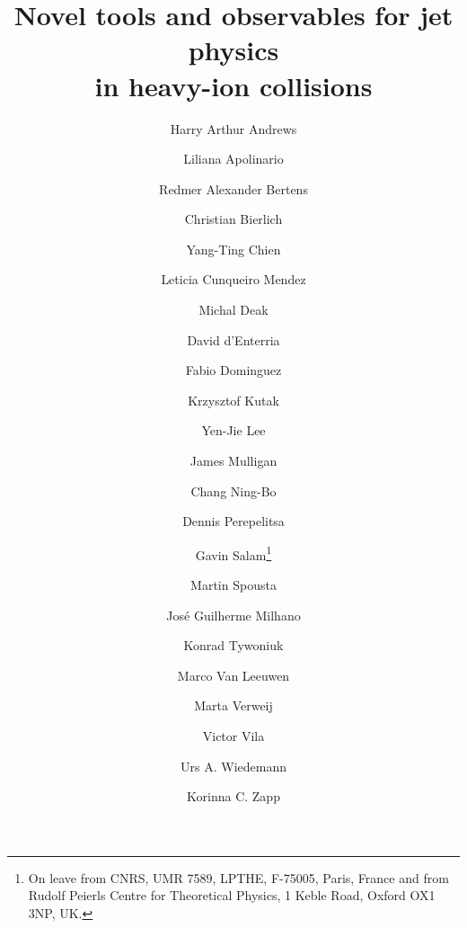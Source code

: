 \documentclass{article}
\begin{document}
\title{Novel tools and observables for jet physics \\ in heavy-ion collisions}
%
\author[bir]{Harry Arthur Andrews}
\author[lip,ist]{Liliana Apolinario}
\author[ten]{Redmer Alexander Bertens}
\author[lund,bohr]{Christian Bierlich}
\author[mit]{Yang-Ting Chien}
\author[oak,ten]{Leticia Cunqueiro Mendez}
\author[ifj]{Michal Deak}
\author[cern]{David d'Enterria}
\author[igf]{Fabio Dominguez}
\author[ifj]{Krzysztof Kutak}
\author[mit]{Yen-Jie Lee}
\author[yal]{James Mulligan}
\author[itp]{Chang Ning-Bo}
\author[col]{Dennis Perepelitsa}
\author[cern]{Gavin Salam\footnote{On leave from CNRS, UMR 7589, LPTHE, F-75005, Paris, France and from Rudolf Peierls Centre for Theoretical Physics, 1 Keble Road, Oxford OX1 3NP, UK.}}
\author[char]{Martin Spousta}
\author[lip,ist,cern]{Jos\'e Guilherme Milhano}
\author[cern]{Konrad Tywoniuk}
\author[nik]{Marco Van Leeuwen}
\author[van,rbrc]{Marta Verweij}
\author[igf]{Victor Vila}
\author[cern]{Urs A. Wiedemann}
\author[lip,cern]{Korinna C. Zapp}
%
\end{document}
